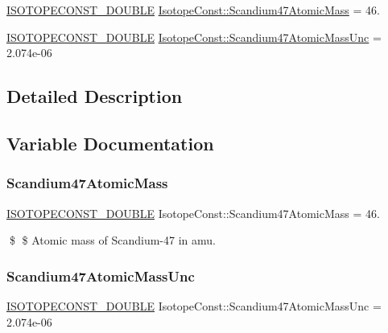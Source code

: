 \begin{DoxyCompactItemize}
\item 
\mbox{\hyperlink{group___isotope_const-_macros_ga8f45a7272ce02c0b4c65c44636ed719a}{I\+S\+O\+T\+O\+P\+E\+C\+O\+N\+S\+T\+\_\+\+D\+O\+U\+B\+LE}} \mbox{\hyperlink{group___isotope_const-_scandium-_sc47_ga9cd703cd857504639d322ee47db2715b}{Isotope\+Const\+::\+Scandium47\+Atomic\+Mass}} = 46.
\item 
\mbox{\hyperlink{group___isotope_const-_macros_ga8f45a7272ce02c0b4c65c44636ed719a}{I\+S\+O\+T\+O\+P\+E\+C\+O\+N\+S\+T\+\_\+\+D\+O\+U\+B\+LE}} \mbox{\hyperlink{group___isotope_const-_scandium-_sc47_ga6643ba8e87dc3769dc9c40e5b97018c2}{Isotope\+Const\+::\+Scandium47\+Atomic\+Mass\+Unc}} = 2.\+074e-\/06
\end{DoxyCompactItemize}


\subsection{Detailed Description}


\subsection{Variable Documentation}
\mbox{\label{group___isotope_const-_scandium-_sc47_ga9cd703cd857504639d322ee47db2715b}} 
\subsubsection{\texorpdfstring{Scandium47\+Atomic\+Mass}{Scandium47AtomicMass}}
{\footnotesize\ttfamily \mbox{\hyperlink{group___isotope_const-_macros_ga8f45a7272ce02c0b4c65c44636ed719a}{I\+S\+O\+T\+O\+P\+E\+C\+O\+N\+S\+T\+\_\+\+D\+O\+U\+B\+LE}} Isotope\+Const\+::\+Scandium47\+Atomic\+Mass = 46.}

\$ \$ Atomic mass of Scandium-\/47 in amu. \mbox{\label{group___isotope_const-_scandium-_sc47_ga6643ba8e87dc3769dc9c40e5b97018c2}} 
\subsubsection{\texorpdfstring{Scandium47\+Atomic\+Mass\+Unc}{Scandium47AtomicMassUnc}}
{\footnotesize\ttfamily \mbox{\hyperlink{group___isotope_const-_macros_ga8f45a7272ce02c0b4c65c44636ed719a}{I\+S\+O\+T\+O\+P\+E\+C\+O\+N\+S\+T\+\_\+\+D\+O\+U\+B\+LE}} Isotope\+Const\+::\+Scandium47\+Atomic\+Mass\+Unc = 2.\+074e-\/06}

